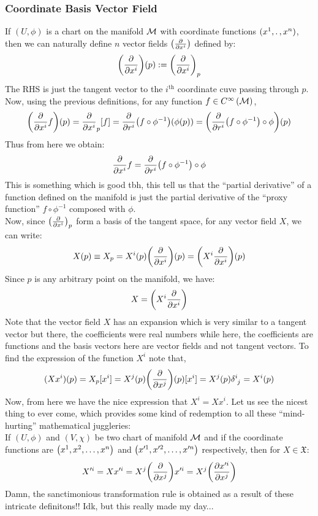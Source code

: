 \subsubsection{Coordinate Basis Vector Field}
If $(U,\phi)$ is a chart on the manifold $\mathcal M$ with coordinate functions $(x^1,\ldotp,x^n)$, then we can naturally define $n$ vector fields $\qty(\pdv{x^i})$ defined by:
$$\qty(\pdv{x^i})(p) := \qty(\pdv{x^i})_p$$
The RHS is just the tangent vector to the $i^{\text{th}}$ coordinate cuve passing through $p$. Now, using the previous definitions, for any function $f\in C^{\infty}\left(\mathcal M\right)$,
\begin{align*}
  \qty(\pdv{x^i}f)(p) = \pdv{x^i}_p [f] = \pdv{r^i}(f\circ \phi^{-1})(\phi(p)) = \qty( \pdv{r^i}(f\circ \phi^{-1})\circ \phi)(p)
\end{align*}
Thus from here we obtain:
$$ \pdv{x^i}f = \pdv{r^i}(f\circ \phi^{-1})\circ \phi$$
This is something which is good tbh, this tell us that the ``partial derivative'' of a function defined on the manifold is just the partial derivative of the ``proxy function'' $f\circ \phi^{-1}$ composed with $\phi$.\\[0.2cm]
Now, since $\qty(\pdv{x^i})_p$ form a basis of the tangent space, for any vector field $X$, we can write:
\begin{align*}
  X(p) \equiv X_p = X^i(p)\qty(\pdv{x^i})(p) = \qty(X^i \pdv{x^i})(p)
\end{align*} 
Since $p$ is any arbitrary point on the manifold, we have:
$$X  = \qty(X^i \pdv{x^i})$$
Note that the vector field $X$ has an expansion which is very similar to a tangent vector but there, the coefficients were real numbers while here, the coefficients are functions and the basis vectors here are vector fields and not tangent vectors. To find the expression of the function $X^i$ note that,
$$(Xx^i)(p) = X_p[x^i] = X^j(p)\qty(\pdv{x^j})(p)[x^i] = X^j(p)\tensor{\delta}{^i_j} = X^i(p)$$
Now, from here we have the nice expression that $X^i = Xx^i$. Let us see the nicest thing to ever come, which provides some kind of redemption to all these ``mind-hurting'' mathematical juggleries:\\[0.2cm]
If $(U,\phi)$ and $(V,\chi)$ be two chart of manifold $\mathcal M$ and if the coordinate functions are $\qty(x^1, x^2,\ldots,x^n)$ and $\qty(x'^1, x'^2,\ldots,x'^n)$ respectively, then for $X\in \mathfrak{X}$:
$$X'^i = Xx'^i = X^j \qty(\pdv{x^j})x'^i = X^j \qty(\pdv{x'^i}{x^j})$$
Damn, the sanctimonious transformation rule is obtained as a result of these intricate definitons!! Idk, but this really made my day...\\[0.3cm]
